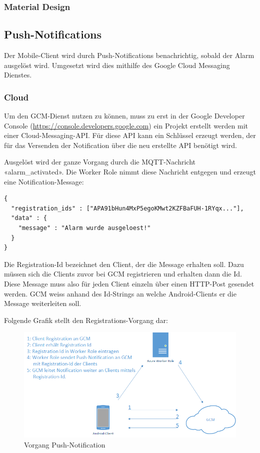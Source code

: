 \subsubsection{Material Design}

\subsection{Push-Notifications}
\label{sec:notificationRealization}
Der Mobile-Client wird durch Push-Notifications benachrichtig, sobald der Alarm ausgelöst wird. Umgesetzt wird dies mithilfe des Google Cloud Messaging Dienstes.

\subsubsection{Cloud}
Um den GCM-Dienst nutzen zu können, muss zu erst in der Google Developer Console (\url{https://console.developers.google.com}) ein Projekt erstellt werden mit einer Cloud-Messaging-API. Für diese API kann ein Schlüssel erzeugt werden, der für das Versenden der Notification über die neu erstellte API benötigt wird.

Ausgelöst wird der ganze Vorgang durch die MQTT-Nachricht «alarm\_activated». Die Worker Role nimmt diese Nachricht entgegen und erzeugt eine Notification-Message:

\begin{lstlisting}[style=csharp, caption=Notification.cs - Notification Message]
{
  "registration_ids" : ["APA91bHun4MxP5egoKMwt2KZFBaFUH-1RYqx..."],
  "data" : {
  	"message" : "Alarm wurde ausgeloest!"
  }
}
\end{lstlisting}

Die Registration-Id bezeichnet den Client, der die Message erhalten soll. Dazu müssen sich die Clients zuvor bei GCM registrieren und erhalten dann die Id. Diese Message muss also für jeden Client einzeln über einen HTTP-Post gesendet werden. GCM weiss anhand des Id-Strings an welche Android-Clients er die Message weiterleiten soll.

Folgende Grafik stellt den Registrations-Vorgang dar:
\begin{figure}[H]
	\centering
		\includegraphics[scale=0.7]{report/img/gcm}
	\caption{Vorgang Push-Notification}
	\label{fig:notification}
\end{figure}

